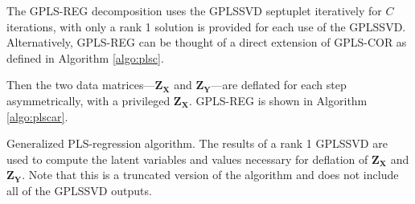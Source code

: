 \documentclass[12pt]{article}
\begin{document}
The GPLS-REG decomposition uses the GPLSSVD septuplet iteratively for
\(C\) iterations, with only a rank 1 solution is provided for each use
of the GPLSSVD. Alternatively, GPLS-REG can be thought of a direct
extension of GPLS-COR as defined in Algorithm \ref{algo:plsc}.

Then the two data matrices---\({\mathbf Z}_{\mathbf X}\) and
\({\mathbf Z}_{\mathbf Y}\)---are deflated for each step asymmetrically,
with a privileged \({\mathbf Z}_{\mathbf X}\). GPLS-REG is shown in
Algorithm \ref{algo:plscar}.

\begin{algorithm}
\DontPrintSemicolon
\SetAlgoLined
{}
\BlankLine
{}
\caption{Generalized PLS-regression algorithm. The results of a rank 1 GPLSSVD are used to compute the latent variables and values necessary for deflation of ${\mathbf Z}_{{\mathbf X}}$ and ${\mathbf Z}_{{\mathbf Y}}$. Note that this is a truncated version of the algorithm and does not include all of the GPLSSVD outputs.}
\label{algo:plscar}
\end{algorithm}
\end{document}
